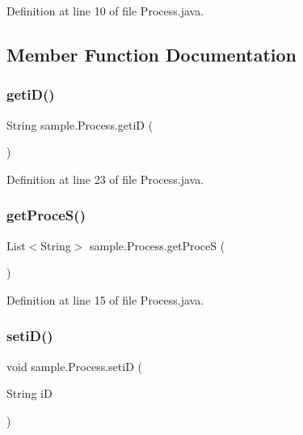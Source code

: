 Definition at line 10 of file Process.\+java.



\subsection{Member Function Documentation}
\mbox{\label{classsample_1_1_process_a4808903237ff8ca8d836927cbf86edfa}} 
\subsubsection{\texorpdfstring{geti\+D()}{getiD()}}
{\footnotesize\ttfamily String sample.\+Process.\+getiD (\begin{DoxyParamCaption}{ }\end{DoxyParamCaption})\hspace{0.3cm}{\ttfamily [inline]}}



Definition at line 23 of file Process.\+java.

\mbox{\label{classsample_1_1_process_a08ed9f9e9ea222f188d91fe339bc2624}} 
\subsubsection{\texorpdfstring{get\+Proce\+S()}{getProceS()}}
{\footnotesize\ttfamily List$<$String$>$ sample.\+Process.\+get\+ProceS (\begin{DoxyParamCaption}{ }\end{DoxyParamCaption})\hspace{0.3cm}{\ttfamily [inline]}}



Definition at line 15 of file Process.\+java.

\mbox{\label{classsample_1_1_process_ab95e8303c9e5d8da093a1b0857ed27ca}} 
\subsubsection{\texorpdfstring{seti\+D()}{setiD()}}
{\footnotesize\ttfamily void sample.\+Process.\+setiD (\begin{DoxyParamCaption}\item[{String}]{iD }\end{DoxyParamCaption})\hspace{0.3cm}{\ttfamily [inline]}}



